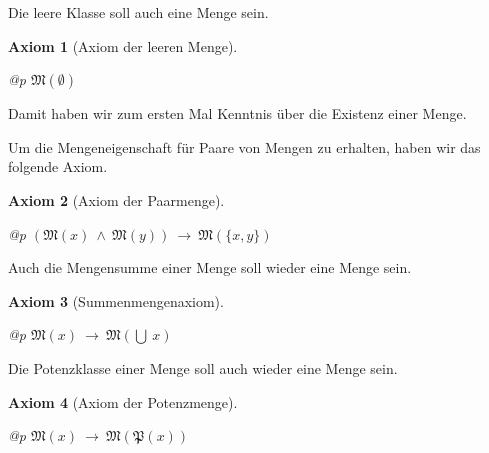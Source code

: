\documentclass[a4paper,german,10pt,twoside]{book}
\newtheorem{ax}{Axiom}
\theoremstyle{definition}
\theoremstyle{remark}
\begin{document}
\par
Die leere Klasse soll auch eine Menge sein.

\begin{ax}[Axiom der leeren Menge]
\label{axiom:emptySet} \hypertarget{axiom:emptySet}{}
\mbox{}
\begin{longtable}{{@{\extracolsep{\fill}}p{\linewidth}}}
\centering $\mathfrak{M}(\emptyset)$
\end{longtable}

\end{ax}

Damit haben wir zum ersten Mal Kenntnis {\"u}ber die Existenz einer Menge.


\par
Um die Mengeneigenschaft f{\"u}r Paare von Mengen zu erhalten, haben wir das
folgende Axiom.

\begin{ax}[Axiom der Paarmenge]
\label{axiom:pairingSet} \hypertarget{axiom:pairingSet}{}
\mbox{}
\begin{longtable}{{@{\extracolsep{\fill}}p{\linewidth}}}
\centering $(\mathfrak{M}(x)\ \land \ \mathfrak{M}(y))\ \rightarrow \ \mathfrak{M}(\{ x, y \})$
\end{longtable}

\end{ax}




\par
Auch die Mengensumme einer Menge soll wieder eine Menge sein.

\begin{ax}[Summenmengenaxiom]
\label{axiom:setSumSet} \hypertarget{axiom:setSumSet}{}
\mbox{}
\begin{longtable}{{@{\extracolsep{\fill}}p{\linewidth}}}
\centering $\mathfrak{M}(x)\ \rightarrow \ \mathfrak{M}(\bigcup \ x)$
\end{longtable}

\end{ax}




\par
Die Potenzklasse einer Menge soll auch wieder eine Menge sein.

\begin{ax}[Axiom der Potenzmenge]
\label{axiom:powerSet} \hypertarget{axiom:powerSet}{}
\mbox{}
\begin{longtable}{{@{\extracolsep{\fill}}p{\linewidth}}}
\centering $\mathfrak{M}(x)\ \rightarrow \ \mathfrak{M}(\mathfrak{P}(x))$
\end{longtable}

\end{ax}
\end{document}

